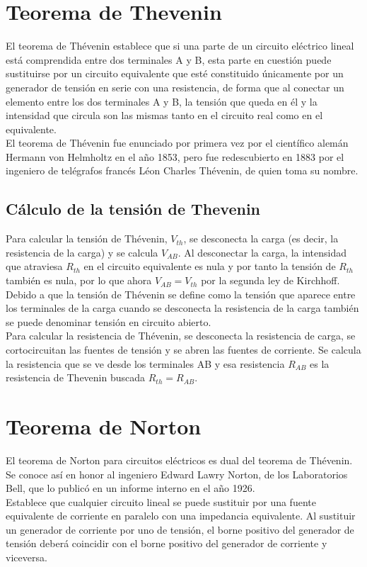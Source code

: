 \documentclass[a4paper,12pt]{report}
\begin{document}
\chapter{Teorema de Thevenin}
El teorema de Thévenin establece que si una parte de un circuito eléctrico lineal está comprendida entre dos terminales A y B, esta parte en cuestión puede sustituirse por un circuito equivalente que esté constituido únicamente por un generador de tensión en serie con una resistencia, de forma que al conectar un elemento entre los dos terminales A y B, la tensión que queda en él y la intensidad que circula son las mismas tanto en el circuito real como en el equivalente.\\
El teorema de Thévenin fue enunciado por primera vez por el científico alemán Hermann von Helmholtz en el año 1853, pero fue redescubierto en 1883 por el ingeniero de telégrafos francés Léon Charles Thévenin, de quien toma su nombre.
\section{Cálculo de la tensión de Thevenin}
Para calcular la tensión de Thévenin, $V_{th}$, se desconecta la carga (es decir, la resistencia de la carga) y se calcula $V_{AB}$. Al desconectar la carga, la intensidad que atraviesa $R_{th}$ en el circuito equivalente es nula y por tanto la tensión de $R_{th}$ también es nula, por lo que ahora $V_{AB} = V_{th}$ por la segunda ley de Kirchhoff.
Debido a que la tensión de Thévenin se define como la tensión que aparece entre los terminales de la carga cuando se desconecta la resistencia de la carga también se puede denominar tensión en circuito abierto.\\
Para calcular la resistencia de Thévenin, se desconecta la resistencia de carga, se cortocircuitan las fuentes de tensión y se abren las fuentes de corriente. Se calcula la resistencia que se ve desde los terminales AB y esa resistencia $R_{AB}$ es la resistencia de Thevenin buscada $R_{th} = R_{AB}$.
\chapter{Teorema de Norton}
El teorema de Norton para circuitos eléctricos es dual del teorema de Thévenin. Se conoce así en honor al ingeniero Edward Lawry Norton, de los Laboratorios Bell, que lo publicó en un informe interno en el año 1926.​\\
Establece que cualquier circuito lineal se puede sustituir por una fuente equivalente de corriente en paralelo con una impedancia equivalente. Al sustituir un generador de corriente por uno de tensión, el borne positivo del generador de tensión deberá coincidir con el borne positivo del generador de corriente y viceversa. 
\end{document}

